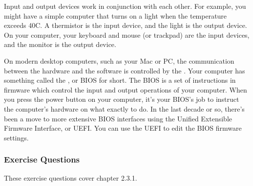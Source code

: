 Input and output devices work in conjunction with each other. For example, you might have a simple computer that turns on a light when the temperature exceeds 40\textdegree C. A thermistor is the input device, and the light is the output device. On your computer, your keyboard and mouse (or trackpad) are the input devices, and the monitor is the output device.\par
On modern desktop computers, such as your Mac or PC, the communication between the hardware and the software is controlled by the . Your computer has something called the , or BIOS for short. The BIOS is a set of instructions in firmware which control the input and output operations of your computer. When you press the power button on your computer, it's your BIOS's job to instruct the computer's hardware on what exactly to do. In the last decade or so, there's been a move to more extensive BIOS interfaces using the Unified Extensible Firmware Interface, or UEFI. You can use the UEFI to edit the BIOS firmware settings.\par
\subsubsection*{Exercise Questions}
These exercise questions cover chapter 2.3.1. 
\begin{Exercise}
\end{Exercise}
\begin{Exercise}
\end{Exercise}    
\begin{Exercise}
\end{Exercise}
